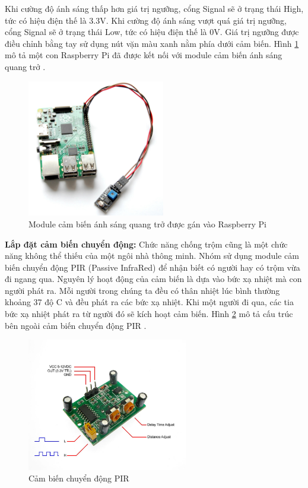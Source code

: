 \documentclass[12pt,a4paper,oneside]{extbook}
\begin{document}
\noindent
Khi cường độ ánh sáng thấp hơn giá trị ngưỡng, cổng Signal sẽ ở trạng thái High, tức có hiệu điện thế là 3.3V. Khi cường độ ánh sáng vượt quá giá trị ngưỡng, cổng Signal sẽ ở trạng thái Low, tức có hiệu điện thế là 0V. Giá trị ngưỡng được điều chỉnh bằng  tay sử dụng nút vặn màu xanh nằm phía dưới cảm biến. Hình \ref{fig:6-light-sensor} mô tả một con Raspberry Pi đã được kết nối với module cảm biến ánh sáng quang trở \cite{light-sensor}\cite{light-sensor-2}.

\begin{figure}[h]
  \centering
     \includegraphics[width=6cm]{6-light-sensor}
  \caption{Module cảm biến ánh sáng quang trở được gán vào Raspberry Pi}\label{fig:6-light-sensor}
\end{figure}

\noindent
\textbf{Lắp đặt cảm biến chuyển động:} Chức năng chống trộm cũng là một chức năng không thể thiếu của một ngôi nhà thông minh. Nhóm sử dụng module cảm biến chuyển động PIR (Passive InfraRed) để nhận biết có người hay có trộm vừa đi ngang qua. Nguyên lý hoạt động của cảm biến là dựa vào bức xạ nhiệt mà con người phát ra. Mỗi người trong chúng ta đều có thân nhiệt lúc bình thường khoảng 37 độ C và đều phát ra các bức xạ nhiệt. Khi một người đi qua, các tia bức xạ nhiệt phát ra từ người đó sẽ kích hoạt cảm biến. Hình \ref{fig:6-pir-sensor} mô tả cấu trúc bên ngoài cảm biến chuyển động PIR \cite{pir-sensor}.

\begin{figure}[h]
  \centering
     \includegraphics[width=7cm]{6-pir-sensor}
  \caption{Cảm biến chuyển động PIR}\label{fig:6-pir-sensor}
\end{figure}
\end{document}
